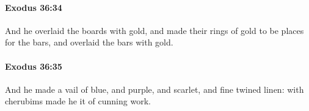 		\paragraph{Exodus 36:34} %
			\label{EXODUS-36-34}

			And he overlaid the boards with gold, and made their rings of gold to be places for the bars, and overlaid the bars with gold.


		\paragraph{Exodus 36:35} %
			\label{EXODUS-36-35}

			And he made a vail of blue, and purple, and scarlet, and fine twined linen: with cherubims made he it of cunning work.


